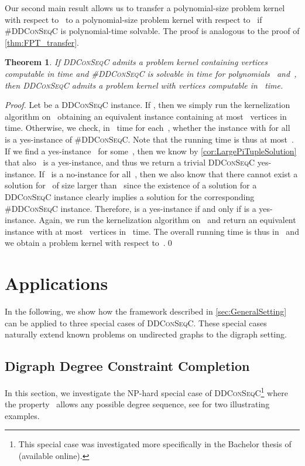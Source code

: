 \documentclass[a4paper,11pt]{article}
\theoremstyle{remark}
\theoremstyle{plain}
\newtheorem{theorem}{Theorem}
\theoremstyle{definition}
\newcommand{\numO}{\textsc{\#}}
\newcommand{\DDCSC}{\textsc{DDConSeqC}\xspace}
\newcommand{\nDDCSC}{\numO\DDCSC}
\begin{document}
Our second main result allows us to transfer a polynomial-size problem kernel with respect to~
to a polynomial-size problem kernel with respect to~ if \nDDCSC is polynomial-time solvable.
The proof is analogous to the proof of \cref{thm:FPT_transfer}.

\begin{theorem}\label{thm:Kernel_transfer}
  If \DDCSC admits a problem kernel containing  vertices computable in  time and \nDDCSC is solvable in  time for polynomials~ and~, then \DDCSC admits a problem kernel with  vertices computable in~ time.
\end{theorem}

\begin{proof}
  Let  be a \DDCSC instance.
  If , then we simply run the kernelization algorithm on~
  obtaining an equivalent instance containing at most~ vertices in~ time.
  Otherwise, we check, in~ time for each~, whether the instance  with  for all~ is a yes-instance of \nDDCSC. Note that the running time is thus at most~.
  If we find a yes-instance~ for some~, then we know by \cref{cor:LargePiTupleSolution} that also~ is a yes-instance, and thus we return a trivial \DDCSC yes-instance. If~ is a no-instance for all~, then we also know that there cannot exist a solution for~ of size larger than~ since the existence of a solution for a \DDCSC instance clearly implies a solution for the corresponding \nDDCSC instance.
  Therefore,  is a yes-instance if and only if  is a yes-instance. Again, we run the kernelization algorithm on~ and return an equivalent instance with at most~ vertices in~ time.
  The overall running time is thus in~ and we obtain a problem kernel with respect to~.\qed
\end{proof}

\section{Applications}

In the following, we show how the framework described in \cref{sec:GeneralSetting} can be applied to three special cases of \DDCSC{}.
These special cases naturally extend known problems on undirected graphs to the digraph setting.

\subsection{Digraph Degree Constraint Completion} \label{sec:DDCC}

In this section, we investigate the NP-hard special case of \DDCSC\footnote{This special case was investigated more specifically
in the Bachelor thesis of \citeauthor{Kos15}~\cite{Kos15} (available online).} where the property~ allows any possible degree sequence, see  for two illustrating examples.
\end{document}
